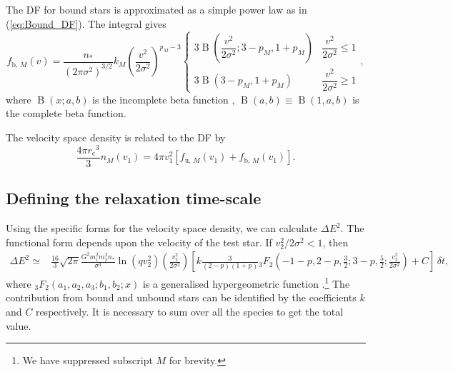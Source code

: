 \documentclass[useAMS,usedcolumn,usegraphicx,usenatbib]{mn2e}
\newcommand{\eqnref}[1]{(\ref{eq:#1})}
\DeclareMathOperator{\Beta}{B}
\newcommand{\sub}[1]{\ensuremath{_\mathrm{#1}}}
\begin{document}
\begin{onecolumn}
The DF for bound stars is approximated as a simple power law as in \eqnref{Bound_DF}. The integral gives
\begin{equation}
f_{\mathrm{b},\,M}(v) = \frac{n_\ast}{\left(2\pi\sigma^2\right)^{3/2}}k_M \left(\frac{v^2}{2\sigma^2}\right)^{p_M - 3}\begin{cases}
3 \Beta\left(\dfrac{v^2}{2\sigma^2}; 3 - p_M, 1 + p_M\right) & \dfrac{v^2}{2\sigma^2} \leq 1 \\
3 \Beta\left(3 - p_M, 1 + p_M\right) & \dfrac{v^2}{2\sigma^2} \geq 1
\end{cases},
\end{equation}
where $\Beta(x;a,b)$ is the incomplete beta function \citep[8.17]{Olver2010}, $\Beta(a,b) \equiv \Beta(1,a,b)$ is the complete beta function.

The velocity space density is related to the DF by
\begin{equation}
\frac{4\pi r\sub{c}^3}{3}n_M(v_1) = 4\pi v_1^2\left[f_{\mathrm{u},\,M}(v_1) + f_{\mathrm{b},\,M}(v_1)\right].
\end{equation}

\subsection{Defining the relaxation time-scale}

Using the specific forms for the velocity space density, we can calculate $\Delta E^2$. The functional form depends upon the velocity of the test star. If $v_2^2/2\sigma^2 < 1$, then
\begin{align}
\Delta E^2 \simeq {} & \frac{16}{3}\sqrt{2\pi}\frac{G^2m_1^2 m_2^2n_\ast}{\sigma^3}\ln\left(qv_2^2\right) \left(\frac{v_2^2}{2\sigma^2}\right) \left[k \frac{3}{(2 - p)(1 + p)}{_3F_2}\left(-1-p,2-p,\frac{3}{2};3-p,\frac{5}{2};\frac{v_2^2}{2\sigma^2}\right) + C\right]\,\delta t,
\end{align}
where ${_3F_2}(a_1,a_2,a_3;b_1,b_2;x)$ is a generalised hypergeometric function \citep[section 16]{Olver2010}.\footnote{We have suppressed subscript $M$ for brevity.} The contribution from bound and unbound stars can be identified by the coefficients $k$ and $C$ respectively. It is necessary to sum over all the species to get the total value.


\end{onecolumn}
\end{document}
